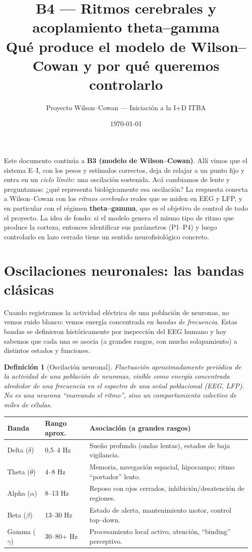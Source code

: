 \documentclass[11pt,a4paper]{article}
\title{\textbf{B4 --- Ritmos cerebrales y acoplamiento theta--gamma}\\[2pt]\large Qué produce el modelo de Wilson--Cowan y por qué queremos controlarlo}
\author{Proyecto Wilson--Cowan --- Iniciación a la I+D ITBA}
\date{\today}
\newtheorem{definition}{Definición}
\begin{document}
\maketitle
\tableofcontents
\bigskip

Este documento continúa a \textbf{B3 (modelo de Wilson--Cowan)}. Allí vimos que el
sistema E--I, con los pesos y estímulos correctos, deja de relajar a un punto fijo y
entra en un \emph{ciclo límite}: una oscilación sostenida. Acá cambiamos de lente y
preguntamos: ¿qué representa biológicamente esa oscilación? La respuesta conecta a
Wilson--Cowan con los \emph{ritmos cerebrales} reales que se miden en EEG y LFP, y en
particular con el régimen \textbf{theta--gamma}, que es el objetivo de control de todo
el proyecto. La idea de fondo: si el modelo genera el mismo tipo de ritmo que produce
la corteza, entonces identificar sus parámetros (P1--P4) y luego controlarlo en lazo
cerrado tiene un sentido neurofisiológico concreto.

\section{Oscilaciones neuronales: las bandas clásicas}

Cuando registramos la actividad eléctrica de una población de neuronas, no vemos ruido
blanco: vemos energía concentrada en \emph{bandas de frecuencia}. Estas bandas se
definieron históricamente por inspección del EEG humano y hoy sabemos que cada una se
asocia (a grandes rasgos, con mucho solapamiento) a distintos estados y funciones.

\begin{definition}[Oscilación neuronal]
Fluctuación aproximadamente periódica de la actividad de una población de neuronas,
visible como energía concentrada alrededor de una frecuencia en el espectro de una
señal poblacional (EEG, LFP). No es una neurona ``marcando el ritmo'', sino un
comportamiento \emph{colectivo} de miles de células.
\end{definition}

\begin{center}
\begin{tabular}{@{}llp{7.2cm}@{}}
\toprule
\textbf{Banda} & \textbf{Rango aprox.} & \textbf{Asociación (a grandes rasgos)} \\
\midrule
Delta ($\delta$) & 0,5--4 Hz  & Sueño profundo (ondas lentas), estados de baja vigilancia. \\
Theta ($\theta$) & 4--8 Hz    & Memoria, navegación espacial, hipocampo; ritmo ``portador'' lento. \\
Alpha ($\alpha$) & 8--13 Hz   & Reposo con ojos cerrados, inhibición/desatención de regiones. \\
Beta ($\beta$)   & 13--30 Hz  & Estado de alerta, mantenimiento motor, control top--down. \\
Gamma ($\gamma$) & 30--80+ Hz & Procesamiento local activo, atención, ``binding'' perceptivo. \\
\bottomrule
\end{tabular}
\end{center}
\end{document}
